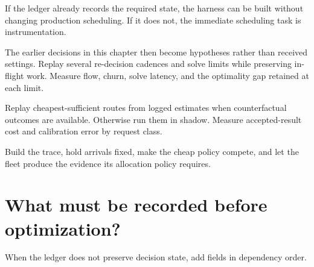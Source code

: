 If the ledger already records the required state, the harness can be built without changing production scheduling. If it does not, the immediate scheduling task is instrumentation.

The earlier decisions in this chapter then become hypotheses rather than received settings. Replay several re-decision cadences and solve limits while preserving in-flight work. Measure flow, churn, solve latency, and the optimality gap retained at each limit.

Replay cheapest-sufficient routes from logged estimates when counterfactual outcomes are available. Otherwise run them in shadow. Measure accepted-result cost and calibration error by request class.

Build the trace, hold arrivals fixed, make the cheap policy compete, and let the fleet produce the evidence its allocation policy requires.

\hypertarget{what-must-be-recorded-before-optimization}{%
\section{What must be recorded before optimization?}\label{what-must-be-recorded-before-optimization}}

When the ledger does not preserve decision state, add fields in dependency order.

